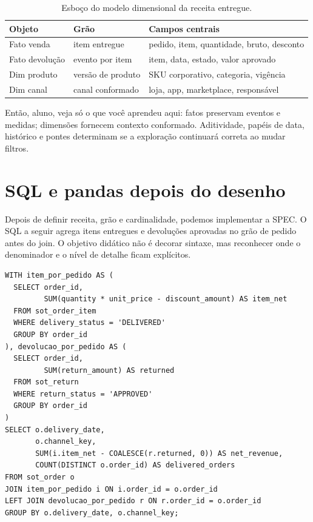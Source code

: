 \begin{table}[htbp]
\centering
\small
\caption{Esboço do modelo dimensional da receita entregue.}
\label{tab:modelo-dimensional}
\begin{tabularx}{0.95\textwidth}{@{}p{2.7cm}p{2.7cm}Y@{}}
\toprule
\textbf{Objeto} & \textbf{Grão} & \textbf{Campos centrais} \\
\midrule
Fato venda & item entregue & pedido, item, quantidade, bruto, desconto \\
Fato devolução & evento por item & item, data, estado, valor aprovado \\
Dim produto & versão de produto & SKU corporativo, categoria, vigência \\
Dim canal & canal conformado & loja, app, marketplace, responsável \\
\bottomrule
\end{tabularx}
\end{table}

\begin{SummaryBox}
Então, aluno, veja só o que você aprendeu aqui: fatos preservam eventos e medidas; dimensões fornecem contexto conformado. Aditividade, papéis de data, histórico e pontes determinam se a exploração continuará correta ao mudar filtros.
\end{SummaryBox}

\section{SQL e pandas depois do desenho}

Depois de definir receita, grão e cardinalidade, podemos implementar a SPEC. O SQL a seguir agrega itens entregues e devoluções aprovadas no grão de pedido antes do join. O objetivo didático não é decorar sintaxe, mas reconhecer onde o denominador e o nível de detalhe ficam explícitos.

\begin{verbatim}
WITH item_por_pedido AS (
  SELECT order_id,
         SUM(quantity * unit_price - discount_amount) AS item_net
  FROM sot_order_item
  WHERE delivery_status = 'DELIVERED'
  GROUP BY order_id
), devolucao_por_pedido AS (
  SELECT order_id,
         SUM(return_amount) AS returned
  FROM sot_return
  WHERE return_status = 'APPROVED'
  GROUP BY order_id
)
SELECT o.delivery_date,
       o.channel_key,
       SUM(i.item_net - COALESCE(r.returned, 0)) AS net_revenue,
       COUNT(DISTINCT o.order_id) AS delivered_orders
FROM sot_order o
JOIN item_por_pedido i ON i.order_id = o.order_id
LEFT JOIN devolucao_por_pedido r ON r.order_id = o.order_id
GROUP BY o.delivery_date, o.channel_key;
\end{verbatim}

